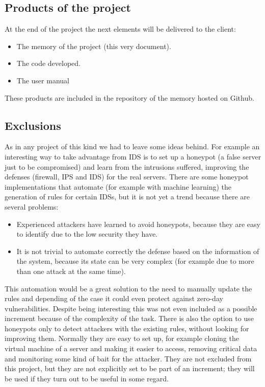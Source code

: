 \subsection{Products of the project}
At the end of the project the next elements will be delivered to the client:
\begin{itemize}
	\item The memory of the project (this very document).
	\item The code developed.
	\item The user manual
\end{itemize}
\linej
These products are included in the repository of the memory hosted on Github\cite{memoria_github}.

\subsection{Exclusions} \label{exclusions} 	%
As in any project of this kind we had to leave some ideas behind.
For example an interesting way to take advantage from IDS is to set up a honeypot (a false server just to be compromised) and learn from the intrusions suffered, improving the defenses (firewall, IPS and IDS) for the real servers.
\linej
There are some honeypot implementations that automate (for example with machine learning) the generation of rules for certain IDSs, but it is not yet a trend because there are several problems\cite{snort_learning}\cite{honeypot_weka_learning}\cite{honeypot_ossec_trees}\cite{snort_honeypot}:
\begin{itemize}
	\item Experienced attackers have learned to avoid honeypots, because they are easy to identify due to the low security they have.
	\item It is not trivial to automate correctly the defense based on the information of the system, because its state can be very complex (for example due to more than one attack at the same time).
\end{itemize}
\linej
This automation would be a great solution to the need to manually update the rules and depending of the case it could even protect against zero-day vulnerabilities. Despite being interesting this was not even included as a possible increment because of the complexity of the task.
\linej
There is also the option to use honeypots only to detect attackers with the existing rules, without looking for improving them. Normally they are easy to set up, for example cloning the virtual machine of a server and making it easier to access, removing critical data and monitoring some kind of bait for the attacker. They are not excluded from this project, but they are not explicitly set to be part of an increment; they will be used if they turn out to be useful in some regard.
